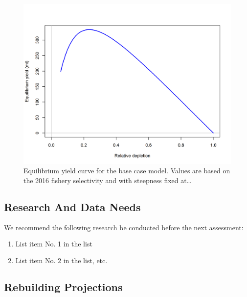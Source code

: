 \documentclass[12pt,]{article}
\begin{document}
\begin{figure}[htbp]
\centering
\includegraphics{r4ss/plots_mod1/yield1_yield_curve.png}
\caption{Equilibrium yield curve for the base case model. Values are
based on the 2016 fishery selectivity and with steepness fixed
at\ldots{} \label{fig:Yield_all}}
\end{figure}

\FloatBarrier

\newpage

\subsection*{Research And Data Needs}\label{research-and-data-needs}

We recommend the following research be conducted before the next
assessment:

\begin{enumerate}

\item List item No. 1 in the list

\item List item No. 2 in the list, etc.

\end{enumerate}

\subsection*{Rebuilding Projections}\label{rebuilding-projections}
\end{document}
